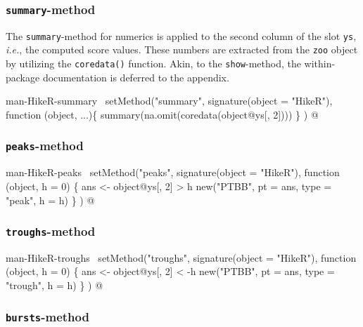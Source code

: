\documentclass[a4paper]{article}
\begin{document}
\subsubsection{\texttt{summary}-method}
The \verb?summary?-method for numerics is applied to the second column of the
slot \verb?ys?, \emph{i.e.}, the computed score values. These numbers are
extracted from the \verb?zoo? object by utilizing the \verb?coredata()?
function. Akin, to the \verb?show?-method, the within-package documentation
is deferred to the appendix.

\nwenddocs{}\endmoddef
\LA{}man-HikeR-summary~{\nwtagstyle{}}\RA{}
setMethod("summary",
          signature(object = "HikeR"),
          function (object, ...)\{
              summary(na.omit(coredata(object@ys[, 2])))
          \}
)
\nwendcode{}@

\subsubsection{\texttt{peaks}-method}

\nwenddocs{}\endmoddef
\LA{}man-HikeR-peaks~{\nwtagstyle{}}\RA{}
setMethod("peaks",
    signature(object = "HikeR"),
    function (object, h = 0) \{
        ans <- object@ys[, 2] > h
        new("PTBB", pt = ans, type = "peak", h = h)
    \}
)
\nwendcode{}@

\subsubsection{\texttt{troughs}-method}

\nwenddocs{}\endmoddef
\LA{}man-HikeR-troughs~{\nwtagstyle{}}\RA{}
setMethod("troughs",
    signature(object = "HikeR"),
    function (object, h = 0) \{
        ans <- object@ys[, 2] < -h
        new("PTBB", pt = ans, type = "trough", h = h)
    \}
)
\nwendcode{}@

\subsubsection{\texttt{bursts}-method}
\end{document}

